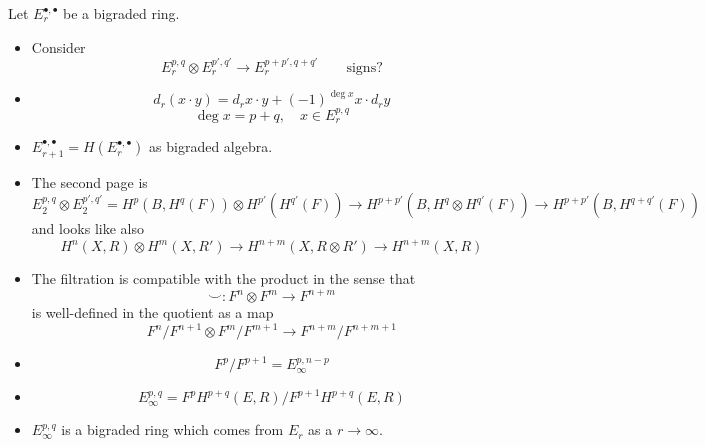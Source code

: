 \documentclass{article}
\begin{document}
Let $E^{\bullet,\bullet}_r$ be a bigraded ring.
\begin{itemize}
	\item Consider
		\[E^{p,q}_r\otimes E^{p',q'}_r\to E^{p+p',q+q'}_r\qquad \text{signs?}\]
	
	\item \[d_r(x\cdot y)=d_rx\cdot y+(-1)^{\deg x}x\cdot d_ry\]
		\[\deg x=p+q,\quad x\in E^{p,q}_r\]
		
\item $E^{\bullet,\bullet}_{r+1}=H(E^{\bullet,\bullet}_r)$ as bigraded algebra.

\item The second page is
	 \[E^{p,q}_2\otimes E^{p',q'}_2=H^{p}(B,H^{q}(F))\otimes H^{p'}(H^{q'}(F))\to H^{p+p'}(B,H^q\otimes H^{q'}(F))\to H^{p+p'}(B,H^{q+q'}(F))\]
	 and looks like also
	 \[H^{n}(X,R)\otimes H^{m}(X,R')\to H^{n+m}(X,R\otimes R')\to H^{n+m}(X,R)\]

\item The filtration is compatible with the product in the sense that
	\[\smile :F^n\otimes F^m\to F^{n+m}\]
	is well-defined in the quotient as a map
	\[F^n/F^{n+1}\otimes F^m/F^{m+1}\to F^{n+m}/F^{n+m+1}\]

\item \[F^p/F^{p+1}=E^{p,n-p}_\infty\]

\item \[E^{p,q}_{\infty}=F^pH^{p+q}(E,R)/F^{p+1}H^{p+q}(E,R)\]

\item $E^{p,q}_\infty$ is a bigraded ring which comes from $E_r$ as a $r\to \infty$.
\end{itemize}
\end{document}
